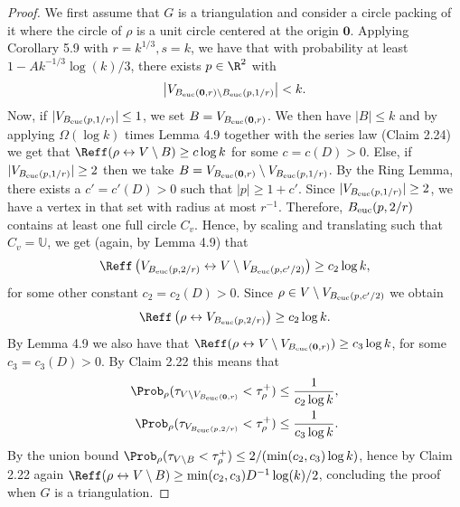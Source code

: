 \begin{proof}
We first assume that $G$ is a triangulation and consider a circle packing of it where the circle of $\rho$ is a unit circle centered at the origin $\mathbf0$. Applying Corollary 5.9 with $r=k^{1/3},s=k$, we have that with probability at least $1-Ak^{-1/3}\log(k)/3$, there exists $p\in\R^2$ with
\[
\left|V_{B_{\rm euc}(\mathbf0,r)\setminus B_{\rm euc}(p,1/r)}\right|<k.
\]
Now, if $|V_{B_{\rm euc}(p,1/r)}|\le1$, we set $B=V_{B_{\rm euc}(\mathbf0,r)}$. We then have $|B|\le k$ and by applying $\Omega(\log k)$ times Lemma 4.9 together with the series law (Claim 2.24) we get that $\Reff(\rho\leftrightarrow V\setminus B)\ge c\log k$ for some $c=c(D)>0$.
Else, if $|V_{B_{\rm euc}(p,1/r)}|\ge2$ then we take $B=V_{B_{\rm euc}(\mathbf0,r)}\setminus V_{B_{\rm euc}(p,1/r)}$. By the Ring Lemma, there exists a $c'=c'(D)>0$ such that $|p|\ge1+c'$. Since $|V_{B_{\rm euc}(p,1/r)}|\ge2$, we have a vertex in that set with radius at most $r^{-1}$. Therefore, $B_{\rm euc}(p,2/r)$ contains at least one full circle $C_v$. Hence, by scaling and translating such that $C_v=\mathbb U$, we get (again, by Lemma 4.9) that
\[
\Reff\left(V_{B_{\rm euc}(p,2/r)}\leftrightarrow V\setminus V_{B_{\rm euc}(p,c'/2)}\right)\ge c_2\log k,
\]
for some other constant $c_2=c_2(D)>0$. Since $\rho\in V\setminus V_{B_{\rm euc}(p,c'/2)}$ we obtain
\[
\Reff\left(\rho\leftrightarrow V_{B_{\rm euc}(p,2/r)}\right)\ge c_2\log k.
\]
By Lemma 4.9 we also have that $\Reff(\rho\leftrightarrow V\setminus V_{B_{\rm euc}(\mathbf0,r)})\ge c_3\log k$, for some $c_3=c_3(D)>0$. By Claim 2.22 this means that
\begin{align*}
\Prob_\rho(\tau_{V\setminus V_{B_{\rm euc}(\mathbf0,r)}}<\tau_\rho^+)&\le\frac1{c_2\log k},\\
\Prob_\rho(\tau_{V_{B_{\rm euc}(p,2/r)}}<\tau_\rho^+)&\le\frac1{c_3\log k}.
\end{align*}
By the union bound $\Prob_\rho(\tau_{V\setminus B}<\tau_\rho^+)\le2/(\min(c_2,c_3)\log k)$, hence by Claim 2.22 again
$\Reff(\rho\leftrightarrow V\setminus B)\ge\min(c_2,c_3)D^{-1}\log(k)/2$,
concluding the proof when $G$ is a triangulation.


\end{proof}

